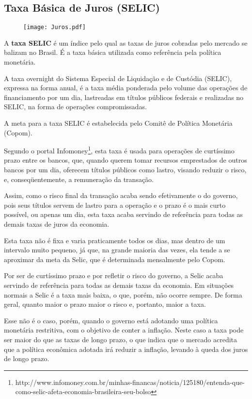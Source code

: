\documentclass[../../relatorio.tex]{subfiles}
\begin{document}
\subsection{Taxa Básica de Juros (SELIC)}

\begin{figure}[ht]
  \begin{minipage}{0.70\textheight}
    \centering
      \texttt{[image: Juros.pdf]}
  \end{minipage}
\end{figure}

A \textbf{taxa SELIC} é um índice pelo qual as taxas de juros cobradas pelo mercado se balizam no Brasil. É a taxa básica utilizada como referência pela política monetária.

A taxa overnight do Sistema Especial de Liquidação e de Custódia (SELIC), expressa na forma anual, é a taxa média ponderada pelo volume das operações de financiamento por um dia, lastreadas em títulos públicos federais e realizadas no SELIC, na forma de operações compromissadas.

A meta para a taxa SELIC é estabelecida pelo Comitê de Política Monetária (Copom).

Segundo o portal
Infomoney\footnote{http://www.infomoney.com.br/minhas-financas/noticia/125180/entenda-que-como-selic-afeta-economia-brasileira-seu-bolso}, esta taxa é usada para operações de curtíssimo prazo
entre os bancos, que, quando querem tomar recursos emprestados de outros
bancos por um dia, oferecem títulos públicos como lastro, visando
reduzir o risco, e, conseqüentemente, a remuneração da transação.

Assim, como o risco final da transação acaba sendo efetivamente o do
governo, pois seus títulos servem de lastro para a operação e o prazo é
o mais curto possível, ou apenas um dia, esta taxa acaba servindo de
referência para todas as demais taxas de juros da economia.

Esta taxa não é fixa e varia praticamente todos os dias, mas dentro de
um intervalo muito pequeno, já que, na grande maioria das vezes, ela
tende a se aproximar da meta da Selic, que é determinada mensalmente
pelo Copom.

Por ser de curtíssimo prazo e por refletir o risco do governo, a Selic
acaba servindo de referência para todas as demais taxas da economia. Em
situações normais a Selic é a taxa mais baixa, o que, porém, não ocorre
sempre. De forma geral, quanto maior o prazo maior o risco e, portanto,
maior a taxa.

Esse não é o caso, porém, quando o governo está adotando uma política
monetária restritiva, com o objetivo de conter a inflação. Neste caso a
taxa pode ser maior do que as taxas de longo prazo, o que indica que o
mercado acredita que a política econômica adotada irá reduzir a
inflação, levando à queda dos juros de longo prazo.

\pagebreak
\end{document}
